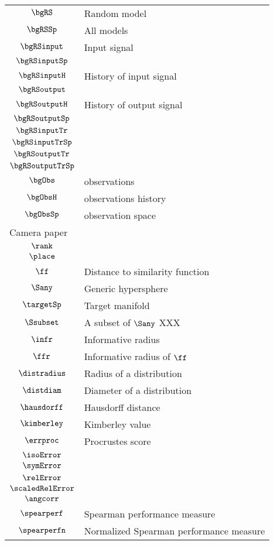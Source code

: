 \begin{longtable}{cl}
 $\bgRS$ &  Random model\\ 
 $\bgRSSp$ &  All models\\ 
 $\bgRSinput$ &  Input signal\\ 
 $\bgRSinputSp$ &  \\ 
 $\bgRSinputH$ &  History of input signal\\ 
 $\bgRSoutput$ & \\ 
 $\bgRSoutputH$ &  History of output signal\\ 
 $\bgRSoutputSp$ &  \\ 
 $\bgRSinputTr$ &  \\ 
 $\bgRSinputTrSp$ &  \\ 
 $\bgRSoutputTr$ &  \\ 
 $\bgRSoutputTrSp$ & \\ 
 $\bgObs$ &  observations\\ 
 $\bgObsH$ &  observations history\\ 
 $\bgObsSp$ &  observation space\\ 
 \multicolumn{2}{l}{Camera paper}\\ 
 \hline
$\rank$ & \\ 
 $\place$ & \\ 
 $\ff$ &  Distance to similarity function\\ 
 $\Sany$ &  Generic hypersphere\\ 
 $\targetSp$ &  Target manifold\\ 
 $\Ssubset$ &  A subset of $\Sany$  XXX\\ 
 $\infr$ &  Informative radius\\ 
 $\ffr$ &  Informative radius of $\ff$\\ 
 $\distradius$ &  Radius of a distribution\\ 
 $\distdiam$ &  Diameter of a distribution\\ 
 $\hausdorff$ &  Hausdorff distance\\ 
 $\kimberley$ &  Kimberley value\\ 
 $\errproc$ &  Procrustes score\\ 
 $\isoError$ & \\ 
 $\symError$ & \\ 
 $\relError$ & \\ 
 $\scaledRelError$ & \\ 
 $\angcorr$ & \\ 
 $\spearperf$ &  Spearman performance measure\\ 
 $\spearperfn$ &  Normalized Spearman performance measure\\ 

\end{longtable}
